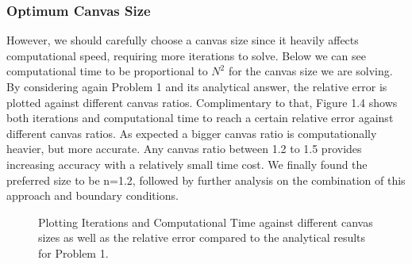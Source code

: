 \documentclass[a4paper]{article}
\begin{document}
\subsubsection{Optimum Canvas Size}
However, we should carefully choose a canvas size since it heavily affects 
computational speed, requiring more iterations to solve. Below we can see 
computational time to be proportional to $N^2$ for the canvas size we are 
solving. By considering again Problem 1 and its analytical answer, the 
relative error is plotted against different canvas ratios. Complimentary to 
that, Figure 1.4 shows both iterations and computational time to reach a 
certain relative error against different canvas ratios. As expected a bigger 
canvas ratio is computationally heavier, but more accurate. Any canvas ratio
between 1.2 to 1.5 provides increasing accuracy with a relatively small time
cost. We finally found the preferred size to be n=1.2, followed by further
analysis on the combination of this approach and boundary conditions. 
\begin{figure}[!h]
  \centering
  \hfill
  \caption{Plotting Iterations and Computational Time against different canvas 
sizes as well as the relative error compared to the analytical results for 
Problem 1. }
\label{fig:optcanv}
\end{figure}
\end{document}

